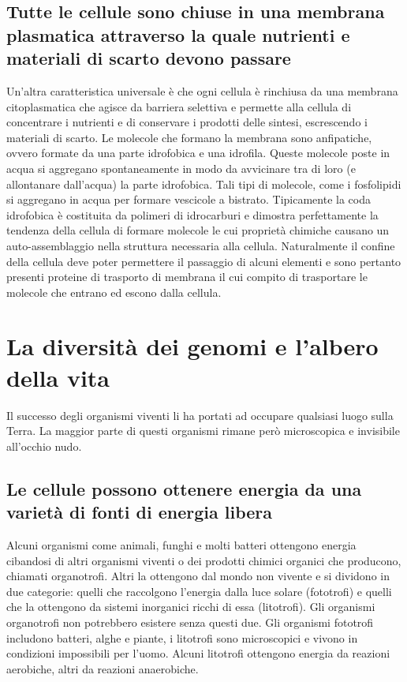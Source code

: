 \subsection{Tutte le cellule sono chiuse in una membrana plasmatica attraverso la quale nutrienti e materiali di scarto devono passare}
Un'altra caratteristica universale \`e che ogni cellula \`e rinchiusa da una membrana citoplasmatica che agisce da barriera selettiva e permette alla cellula di concentrare i nutrienti e
di conservare i prodotti delle sintesi, escrescendo i materiali di scarto. Le molecole che formano la membrana sono anfipatiche, ovvero formate da una parte idrofobica e una idrofila. 
Queste molecole poste in acqua si aggregano spontaneamente in modo da avvicinare tra di loro (e allontanare dall'acqua) la parte idrofobica. Tali tipi di molecole, come i fosfolipidi si
aggregano in acqua per formare vescicole  a bistrato. Tipicamente la coda idrofobica \`e costituita da polimeri di idrocarburi e dimostra perfettamente la tendenza della cellula di formare
molecole le cui propriet\`a chimiche causano un auto-assemblaggio nella struttura necessaria alla cellula. Naturalmente il confine della cellula deve poter permettere il passaggio di 
alcuni elementi e sono pertanto presenti proteine di trasporto di membrana il cui compito di trasportare le molecole che entrano ed escono dalla cellula. 
\section{La diversit\`a dei genomi e l'albero della vita}
Il successo degli organismi viventi li ha portati ad occupare qualsiasi luogo sulla Terra. La maggior parte di questi organismi rimane per\`o microscopica e invisibile all'occhio nudo.
\subsection{Le cellule possono ottenere energia da una variet\`a di fonti di energia libera}
Alcuni organismi come animali, funghi e molti batteri ottengono energia cibandosi di altri organismi viventi o dei prodotti chimici organici che producono, chiamati organotrofi. Altri 
la ottengono dal mondo non vivente e si dividono in due categorie: quelli che raccolgono l'energia dalla luce solare (fototrofi) e quelli che la ottengono da sistemi inorganici ricchi di
essa (litotrofi). Gli organismi organotrofi non potrebbero esistere senza questi due. Gli organismi fototrofi includono batteri, alghe e piante, i litotrofi sono microscopici e vivono
in condizioni impossibili per l'uomo. Alcuni litotrofi ottengono energia da reazioni aerobiche, altri da reazioni anaerobiche. 
